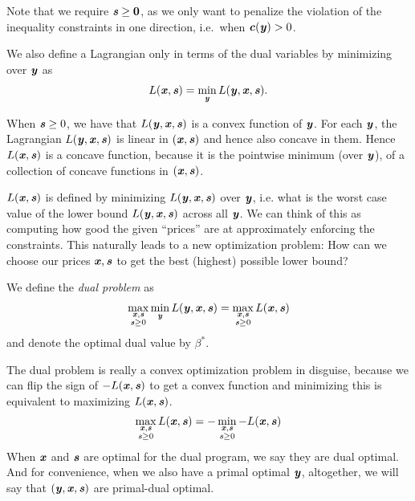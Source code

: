 \begin{definition}
Note that we require $\ss \geq \veczero$, as we only want to penalize the violation of the inequality constraints in one direction, i.e.\ when $\cc(\yy) > 0$.


We also define a Lagrangian only in terms of the dual variables by minimizing over $\yy$ as
\begin{equation*} L(\xx, \ss) = \min_{\yy}L(\yy, \xx,
  \ss). \end{equation*}

\end{definition}
When $\ss \geq 0$, we have that $L(\yy,\xx,\ss)$ is a
convex function of $\yy$.
For each $\yy$, the Lagrangian $L(\yy, \xx,
\ss)$ is linear in $(\xx,\ss)$ and hence also concave in them.
Hence $L(\xx,  \ss)$ is a concave function, because it is the pointwise
minimum (over $\yy$), of a collection of concave functions in
$(\xx,\ss)$.


$L(\xx, \ss)$ is defined by minimizing $L(\yy,\xx,\ss)$ over $\yy$,
i.e. what is the worst case value of the lower bound $L(\yy,\xx,\ss)$
across all $\yy$.
We can think of this as computing how good the given ``prices'' are at
approximately enforcing the constraints.
This naturally leads to a new optimization problem: How can we choose
our prices $\xx, \ss$ to get the best (highest) possible lower bound?

\begin{definition}
We define the \emph{dual problem} as
\begin{align}
  \label{eq:dualprob}
  \max_{\substack{\xx, \ss \\ \ss \geq 0}}
  \min_{\yy}L(\yy, \xx, \ss)
  =
  \max_{\substack{\xx, \ss \\ \ss \geq 0}} L(\xx,  \ss)
  \end{align}
and denote the optimal dual value by $\beta^*$.
\end{definition}

The dual problem is really a convex optimization
problem in disguise, because we can flip the sign of $-L(\xx,  \ss)$
to get a convex function and minimizing this is equivalent to
maximizing $L(\xx,  \ss)$.
\begin{align*}
  \max_{\substack{\xx, \ss \\ \ss \geq 0}} L(\xx,  \ss)
  =
  -
  \min_{\substack{\xx, \ss \\ \ss \geq 0}} -L(\xx,  \ss)
\end{align*}
When $\xx$ and $\ss$ are optimal for the dual program, we
say they are dual optimal. And for convenience, when we also have a
primal optimal $\yy$, altogether, we will say that $(\yy,\xx,\ss)$ are
primal-dual optimal.

